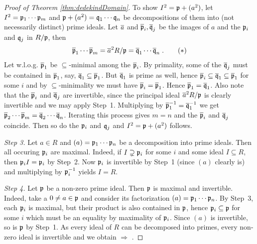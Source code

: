 \documentclass[a4paper,parskip=half,numbers=enddot, DIV=12]{scrreprt}
\begin{document}
\begin{proof}[Proof of Theorem \ref{thm:dedekindDomain}]
To show $I^2=\mathfrak{p}+(a^2)$, let $I^2=\mathfrak{p}_1\cdots \mathfrak{p}_m$ and $\mathfrak{p}+(a^2)=\mathfrak{q}_1\cdots\mathfrak{q}_n$ be decompositions of them into (not necessarily distinct) prime ideals. Let $\overline a$ and $\overline{\mathfrak{p}}_i,\overline{\mathfrak{q}}_j$ be the images of $a$ and the $\mathfrak{p}_i$ and $\mathfrak{q}_j$ in $R/\mathfrak{p}$, then
\begin{align}\lbl{eq:decompInR/p}
	\ov \pp_1\cdots \ov \pp_m=\ov a^2R/\pp=\ov \qq_1\cdots\ov \qq_n\;.\tag{$*$}
\end{align}
Let w.l.o.g. $\overline {\mathfrak{p}}_1$ be $\subseteq$-minimal among the $\overline {\mathfrak{p}}_i$. By primality, some of the $\overline {\mathfrak{q}}_j$ must be contained in $\overline {\mathfrak{p}}_1$, say, $\overline {\mathfrak{q}}_1\subseteq \overline {\mathfrak{p}}_1$. But $\overline {\mathfrak{q}}_1$ is prime as well, hence $\overline {\mathfrak{p}}_i\subseteq \overline {\mathfrak{q}}_1\subseteq \overline {\mathfrak{p}}_1$ for some $i$ and by $\subseteq$-minimality we must have $\overline {\mathfrak{p}}_i=\overline {\mathfrak{p}}_1$. Hence $\overline {\mathfrak{p}}_1=\overline {\mathfrak{q}}_1$. Also note that the $\overline {\mathfrak{p}}_i$ and $\overline {\mathfrak{q}}_j$ are invertible, since the principal ideal $\overline a^2R/\mathfrak{p}$ is clearly invertible and we may apply Step~1. Multiplying  by $\overline {\mathfrak{p}}_1^{-1}=\overline {\mathfrak{q}}_1^{-1}$ we get $\overline {\mathfrak{p}}_2\cdots \overline {\mathfrak{p}}_m=\overline {\mathfrak{q}}_2\cdots \overline {\mathfrak{q}}_n$. Iterating this process gives $m=n$ and the $\overline {\mathfrak{p}}_i$ and $\overline {\mathfrak{q}}_j$ coincide. Then so do the $\mathfrak{p}_i$ and $\mathfrak{q}_j$ and $I^2=\mathfrak{p}+(a^2)$ follows.

\emph{Step 3.} Let $a\in R$ and $(a)=\mathfrak{p}_1\cdots \mathfrak{p}_n$ be a decomposition into prime ideals. Then all occuring $\mathfrak{p}_i$ are maximal. Indeed, if $I\supsetneq \mathfrak{p}_i$ for some $i$ and some ideal $I\subseteq R$, then $\mathfrak{p}_iI=\mathfrak{p}_i$ by Step~2. Now $\mathfrak{p}_i$ is invertible by Step~1 (since $(a)$ clearly is) and multiplying by $\mathfrak{p}_i^{-1}$ yields $I=R$.

\emph{Step 4.} Let $\mathfrak{p}$ be a non-zero prime ideal. Then $\mathfrak{p}$ is maximal and invertible. Indeed, take a $0\neq a\in\mathfrak{p}$ and consider its factorization $(a)=\mathfrak{p}_1\cdots \mathfrak{p}_n$. By Step~3, each $\mathfrak{p}_i$ is maximal, but their product is also contained in $\mathfrak{p}$, hence $\mathfrak{p}_i\subseteq\mathfrak{p}$ for some $i$ which must be an equality by maximality of $\mathfrak{p}_i$. Since $(a)$ is invertible, so is $\mathfrak{p}$ by Step~1. As every ideal of $R$ can be decomposed into primes, every non-zero ideal is invertible and we obtain  $\Rightarrow$ .


\end{proof}
\end{document}
